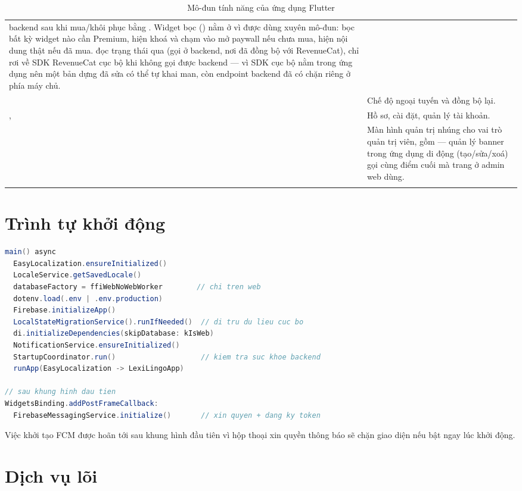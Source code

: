 \begin{longtable}{L{3.2cm} L{10.4cm}}
backend sau khi mua/khôi phục bằng . Widget bọc
 () nằm ở  vì được
dùng xuyên mô-đun: bọc bất kỳ widget nào cần Premium, hiện khoá và chạm vào mở paywall
nếu chưa mua, hiện nội dung thật nếu đã mua.  đọc trạng thái qua
 (gọi  ở backend, nơi đã đồng bộ với
RevenueCat), chỉ rơi về SDK RevenueCat cục bộ khi không gọi được backend — vì SDK cục bộ
nằm trong ứng dụng nên một bản dựng đã sửa có thể tự khai man, còn endpoint backend đã có
 chặn riêng ở phía máy chủ.\\
 & Chế độ ngoại tuyến và đồng bộ lại.\\
,  & Hồ sơ, cài đặt, quản lý tài khoản.\\
 & Màn hình quản trị nhúng cho vai trò quản trị viên, gồm
 — quản lý banner trong ứng dụng di động (tạo/sửa/xoá) gọi
cùng điểm cuối  mà trang  ở admin web dùng.\\
\bottomrule
\caption{Mô-đun tính năng của ứng dụng Flutter}
\end{longtable}

\section{Trình tự khởi động}

\begin{lstlisting}[language=Java]
main() async
  EasyLocalization.ensureInitialized()
  LocaleService.getSavedLocale()
  databaseFactory = ffiWebNoWebWorker        // chi tren web
  dotenv.load(.env | .env.production)
  Firebase.initializeApp()
  LocalStateMigrationService().runIfNeeded()  // di tru du lieu cuc bo
  di.initializeDependencies(skipDatabase: kIsWeb)
  NotificationService.ensureInitialized()
  StartupCoordinator.run()                    // kiem tra suc khoe backend
  runApp(EasyLocalization -> LexiLingoApp)

// sau khung hinh dau tien
WidgetsBinding.addPostFrameCallback:
  FirebaseMessagingService.initialize()       // xin quyen + dang ky token
\end{lstlisting}

Việc khởi tạo FCM được hoãn tới sau khung hình đầu tiên vì hộp thoại xin quyền thông báo
sẽ chặn giao diện nếu bật ngay lúc khởi động.

\section{Dịch vụ lõi}


